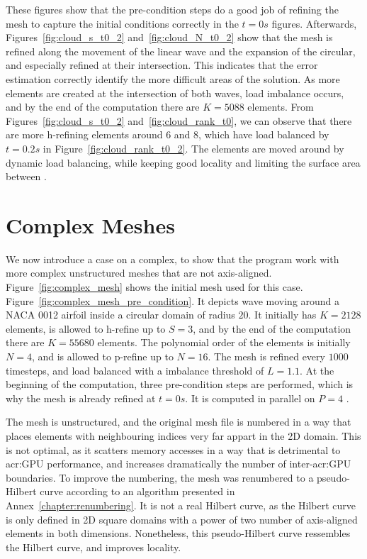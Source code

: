 These figures show that the pre-condition steps do a good job of refining the mesh to capture the
initial conditions correctly in the \(t = 0 s\) figures. Afterwards, Figures~\ref{fig:cloud_s_t0_2}
and~\ref{fig:cloud_N_t0_2} show that the mesh is refined along the movement of the linear wave and
the expansion of the circular, and especially refined at their intersection. This indicates that the
error estimation correctly identify the more difficult areas of the solution. As more elements are
created at the intersection of both waves, load imbalance occurs, and by the end of the computation
there are \(K = 5088\) elements. From Figures~\ref{fig:cloud_s_t0_2} and~\ref{fig:cloud_rank_t0}, we
can observe that there are more h-refining elements around  \(6\) and \(8\),
which have load balanced by \(t = 0.2 s\) in Figure~\ref{fig:cloud_rank_t0_2}. The elements are
moved around by dynamic load balancing, while keeping good locality and limiting the surface area
between .

\section{Complex Meshes}\label{section:results:complex_meshes}

We now introduce a case on a complex, to show that the program work with more complex unstructured
meshes that are not axis-aligned. Figure~\ref{fig:complex_mesh} shows the initial mesh used for this
case. Figure~\ref{fig:complex_mesh_pre_condition}. It depicts wave moving around a NACA 0012 airfoil
inside a circular domain of radius \(20\). It initially has \(K = 2128\) elements, is allowed to
h-refine up to \(S = 3\), and by the end of the computation there are \(K = 55680\) elements. The
polynomial order of the elements is initially \(N = 4\), and is allowed to p-refine up to \(N =
16\). The mesh is refined every \(1000\) timesteps, and load balanced with a imbalance threshold of
\(L = 1.1\). At the beginning of the computation, three pre-condition steps are performed, which is
why the mesh is already refined at \(t = 0 s\). It is computed in parallel on \(P = 4\)
.

The mesh is unstructured, and the original mesh file is numbered in a way that places elements with
neighbouring indices very far appart in the 2D domain. This is not optimal, as it scatters memory
accesses in a way that is detrimental to \acrshort{acr:GPU} performance, and increases dramatically
the number of inter-\acrshort{acr:GPU} boundaries. To improve the numbering, the mesh was renumbered
to a pseudo-Hilbert curve according to an algorithm presented in Annex~\ref{chapter:renumbering}. It
is not a real Hilbert curve, as the Hilbert curve is only defined in 2D square domains with a power
of two number of axis-aligned elements in both dimensions. Nonetheless, this pseudo-Hilbert curve
ressembles the Hilbert curve, and improves locality.

